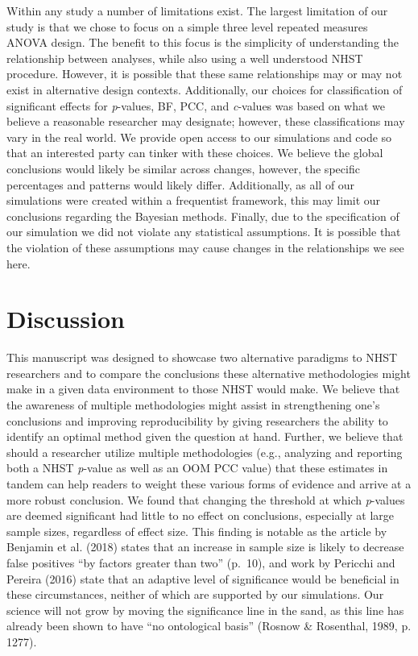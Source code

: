 \documentclass[,man, mask]{apa6}
\begin{document}
Within any study a number of limitations exist. The largest limitation of our study is that we chose to focus on a simple three level repeated measures ANOVA design. The benefit to this focus is the simplicity of understanding the relationship between analyses, while also using a well understood NHST procedure. However, it is possible that these same relationships may or may not exist in alternative design contexts. Additionally, our choices for classification of significant effects for \emph{p}-values, BF, PCC, and \emph{c}-values was based on what we believe a reasonable researcher may designate; however, these classifications may vary in the real world. We provide open access to our simulations and code so that an interested party can tinker with these choices. We believe the global conclusions would likely be similar across changes, however, the specific percentages and patterns would likely differ. Additionally, as all of our simulations were created within a frequentist framework, this may limit our conclusions regarding the Bayesian methods. Finally, due to the specification of our simulation we did not violate any statistical assumptions. It is possible that the violation of these assumptions may cause changes in the relationships we see here.

\hypertarget{discussion}{%
\section{Discussion}\label{discussion}}

This manuscript was designed to showcase two alternative paradigms to NHST researchers and to compare the conclusions these alternative methodologies might make in a given data environment to those NHST would make. We believe that the awareness of multiple methodologies might assist in strengthening one's conclusions and improving reproducibility by giving researchers the ability to identify an optimal method given the question at hand. Further, we believe that should a researcher utilize multiple methodologies (e.g., analyzing and reporting both a NHST \emph{p}-value as well as an OOM PCC value) that these estimates in tandem can help readers to weight these various forms of evidence and arrive at a more robust conclusion. We found that changing the threshold at which \emph{p}-values are deemed significant had little to no effect on conclusions, especially at large sample sizes, regardless of effect size. This finding is notable as the article by Benjamin et al. (2018) states that an increase in sample size is likely to decrease false positives \enquote{by factors greater than two} (p.~10), and work by Pericchi and Pereira (2016) state that an adaptive level of significance would be beneficial in these circumstances, neither of which are supported by our simulations. Our science will not grow by moving the significance line in the sand, as this line has already been shown to have \enquote{no ontological basis} (Rosnow \& Rosenthal, 1989, p. 1277).
\end{document}
